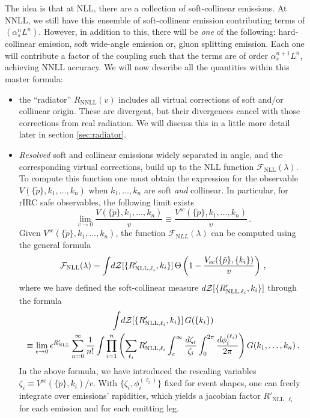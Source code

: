 The idea is that at NLL, there are a collection of soft-collinear emissions. 
At NNLL, we still have this ensemble of soft-collinear emission contributing terms of $(\alpha_s^n L^n)$. However, in addition to this, there will be \emph{one} of the following: hard-collinear emission, soft wide-angle emission or, gluon splitting emission. Each one will contribute a factor of the coupling such that the terms are of order $\alpha_s^{n+1} L^n$, achieving NNLL accuracy.
We will now describe all the quantities within this master formula:
\begin{itemize}
\item the ``radiator'' $R_{\mathrm{NNLL}}(v)$ includes all virtual
  corrections of soft and/or collinear origin. These are divergent,
  but their divergences cancel with those corrections from real radiation. We will discuss this in a little more detail later in section \ref{sec:radiator}.
\item \emph{Resolved} soft and collinear emissions widely separated in
  angle, and the corresponding virtual corrections, build up to the
  NLL function $\mathcal{F}_{\mathrm{NLL}}(\lambda)$. To compute this
  function one must obtain the expression for the observable
  $V(\{\tilde p\},k_1,\dots,k_n)$ when $k_1,\dots, k_n$ are soft
  \emph{and} collinear. In particular, for rIRC safe observables, the
  following limit exists
  \begin{equation}
    \label{eq:V-lim}
    \lim_{v\to 0}\frac{V(\{\tilde p\},k_1,\dots,k_n)}{v} \equiv \frac{V^{\mathrm sc}(\{\tilde p\},k_1,\dots,k_n)}{v}\,.
  \end{equation}
  Given $V^{\mathrm{sc}}(\{\tilde p\},k_1,\dots,k_n)$, the function $\mathcal{F}_{\mathrm NLL}(\lambda)$ can be computed using the general formula
 \begin{equation}
    \label{eq:FNLL-formula}
    \mathcal{F}_{\mathrm{NLL}}(\lambda) = \int\! d{\mathcal Z}[\{R'_{\mathrm{NLL}, \ell_i}, k_i\}] \,\Theta\left(1-\frac{V_{\mathrm sc}(\{\tilde{p}\},\{k_i\})}{v}\right)\,,
  \end{equation}
  where we have defined the soft-collinear measure $d{\mathcal Z}[\{R'_{\mathrm{NLL}, \ell_i}, k_i\}]$ through the formula
  \begin{multline}
    \label{eq:dZ-def}
    \int\! d{\mathcal Z}[\{R'_{\mathrm{NLL}, \ell_i}, k_i\}] \,G(\{k_i\}) \\ \equiv \lim_{\epsilon\to 0} \epsilon^{R'_{\mathrm{NLL}}} \sum_{n=0}^\infty\frac{1}{n!} \int \prod_{i=1}^n \left(\sum_{\ell_i} R'_{\text{NLL},\ell_i}\int_{\epsilon}^\infty \frac{d\zeta_i}{\zeta_i}\int_0^{2\pi}\frac{d\phi_i^{(\ell_i)}}{2\pi}\right)G(k_1,\dots,k_n)\,.
\end{multline}
In the above formula, we have introduced the rescaling variables
$\zeta_i\equiv V^{\mathrm{sc}}(\{\tilde p\},k_i)/v$. With
$\{\zeta_i,\phi_i^{(\ell_i)}\}$ fixed for event shapes, one can freely
integrate over emissions' rapidities, which yields a jacobian factor
$R'_{\text{NLL},\ell_i}$ for each emission and for each emitting leg.


\end{itemize}
